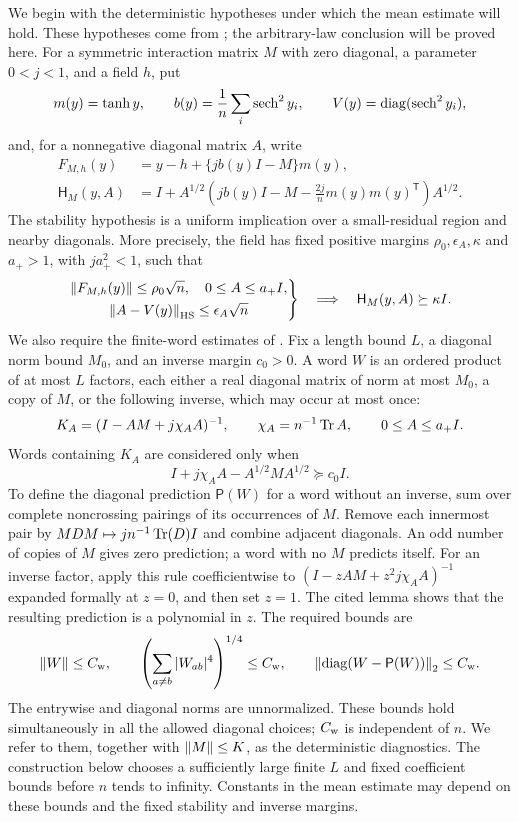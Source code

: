 We begin with the deterministic hypotheses under which the mean estimate
will hold.  These hypotheses come from \cite{SKGap}; the arbitrary-law
conclusion will be proved here.  For a symmetric interaction matrix $M$
with zero diagonal,
a parameter $0<j<1$, and a field $h$, put
\[
 m(y)=\tanh y,\qquad b(y)=\frac1n\sum_i\operatorname{sech}^2 y_i,
 \qquad V(y)=\operatorname{diag}(\operatorname{sech}^2 y_i),
\]
and, for a nonnegative diagonal matrix $A$, write
\begin{align}
 F_{M,h}(y)&=y-h+\{j b(y)I-M\}m(y),\label{eq:stat-field-map}\\
 \mathsf H_M(y,A)
 &=I+A^{1/2}\left(jb(y)I-M-\frac{2j}{n}
                 m(y)m(y)^{\mathsf T}\right)A^{1/2}.
 \label{eq:stat-field-hessian}
\end{align}
The stability hypothesis is a uniform implication over a small-residual
region and nearby diagonals.  More precisely, the field has fixed positive
margins $\rho_0,\epsilon_A,\kappa$ and $a_+>1$, with $j a_+^2<1$, such that
\begin{equation}\label{eq:stat-stability}
 \left.
 \begin{gathered}
 \left\lVert F_{M,h}(y)\right\rVert\le\rho_0\sqrt n,\quad 0\le A\le a_+I,\\
 \left\lVert A-V(y)\right\rVert_{\mathrm{HS}}\le\epsilon_A\sqrt n
 \end{gathered}\right\}
 \quad\Longrightarrow\quad \mathsf H_M(y,A)\succeq\kappa I.
\end{equation}
We also require the finite-word estimates of \cite[Lemma~3.1]{SKGap}.
Fix a length bound $L$, a diagonal norm bound $M_0$, and an inverse margin
$c_0>0$. A word $W$ is an ordered product of at most $L$ factors, each
either a real diagonal matrix of norm at most $M_0$, a copy of $M$, or
the following inverse, which may occur at most once:
\[
 K_A=(I-AM+j\chi_AA)^{-1},\qquad \chi_A=n^{-1}\operatorname{Tr} A,
 \qquad 0\le A\le a_+I.
\]
Words containing $K_A$ are considered only when
\[
 I+j\chi_AA-A^{1/2}MA^{1/2}\succeq c_0I.
\]
To define the diagonal prediction $\mathsf P(W)$ for a word without an
inverse, sum over complete noncrossing pairings of its occurrences of
$M$. Remove each innermost pair by
$MDM\mapsto j n^{-1}\operatorname{Tr}(D)I$ and combine adjacent diagonals. An odd number
of copies of $M$ gives zero prediction; a word with no $M$ predicts itself.
For an inverse factor, apply this rule coefficientwise to
$(I-zAM+z^2j\chi_AA)^{-1}$ expanded formally at $z=0$, and then set $z=1$.
The cited lemma shows that the resulting prediction is a polynomial in $z$.
The required bounds are
\begin{equation}\label{eq:stat-word-diagnostics}
 \left\lVert W\right\rVert\le C_{\rm w},\qquad
 \left(\sum_{a\ne b}|W_{ab}|^4\right)^{1/4}\le C_{\rm w},\qquad
 \left\lVert \operatorname{diag}(W-\mathsf P(W))\right\rVert_2\le C_{\rm w}.
\end{equation}
The entrywise and diagonal norms are unnormalized. These bounds hold
simultaneously in all the allowed diagonal choices; $C_{\rm w}$ is
independent of $n$. We refer to them, together with $\left\lVert M\right\rVert\le K$, as
the deterministic diagnostics. The construction below chooses a sufficiently
large finite $L$ and fixed coefficient bounds before $n$ tends to infinity.
Constants in the mean estimate may depend on these bounds and the fixed
stability and inverse margins.

